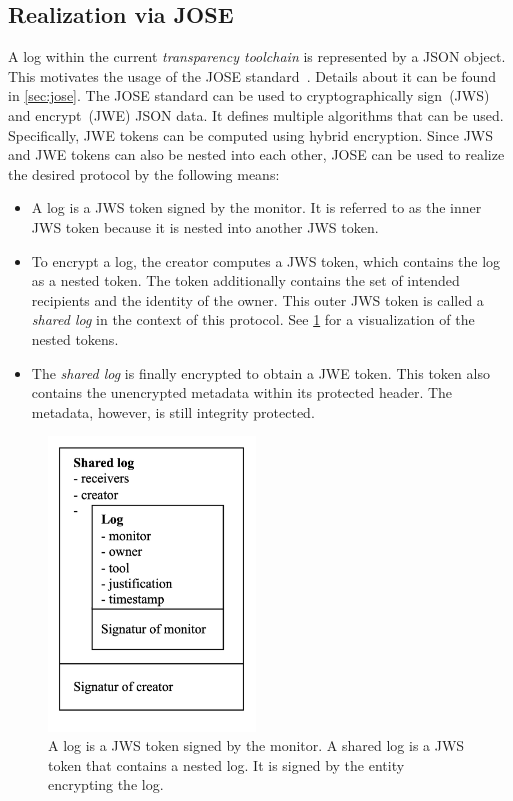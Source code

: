 \documentclass[../main.tex]{subfiles}
\begin{document}
\subsection{Realization via JOSE}
\label{sec:jose-protocol}

A log within the current \emph{transparency toolchain} is represented by a JSON object.
This motivates the usage of the JOSE standard~\cite{Barnes2014}.
Details about it can be found in \cref{sec:jose}.
The JOSE standard can be used to cryptographically sign~(JWS) and encrypt~(JWE) JSON data.
It defines multiple algorithms that can be used.
Specifically, JWE tokens can be computed using hybrid encryption.
Since JWS and JWE tokens can also be nested into each other, JOSE can be used to realize the desired protocol by the following means:
\begin{itemize}
    \item 
    A log is a JWS token signed by the monitor.
    It is referred to as the inner JWS token because it is nested into another JWS token.
    \item 
    To encrypt a log, the creator computes a JWS token, which contains the log as a nested token.
    The token additionally contains the set of intended recipients and the identity of the owner.
    This outer JWS token is called a \emph{shared log} in the context of this protocol.
    See \cref{fig:nested-jws} for a visualization of the nested tokens.
    \item
    The \emph{shared log} is finally encrypted to obtain a JWE token.
    This token also contains the unencrypted metadata within its protected header.
    The metadata, however, is still integrity protected.
\end{itemize}


\begin{figure}[h!]
    \includegraphics[width=5.5cm]{../img/05/nested_jws.png}
    \centering
    \caption[Nested JWS tokens]{A log is a JWS token signed by the monitor. A shared log is a JWS token that contains a nested log. It is signed by the entity encrypting the log.}
    \label{fig:nested-jws}
\end{figure}
\end{document}
